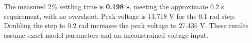 The measured 2\% settling time is \textbf{0.198 s}, meeting the approximate 0.2 s requirement, with no overshoot. Peak voltage is 13.718 V for the 0.1 rad step. Doubling the step to 0.2 rad increases the peak voltage to 27.436 V. These results assume exact model parameters and an unconstrained voltage input.
